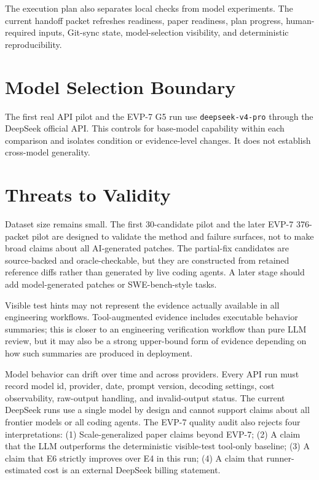\documentclass[conference]{IEEEtran}
\begin{document}
The execution plan also separates local checks from model experiments. The
current handoff packet refreshes readiness, paper readiness, plan progress,
human-required inputs, Git-sync state, model-selection visibility, and
deterministic reproducibility.

\section{Model Selection Boundary}

The first real API pilot and the EVP-7 G5 run use \texttt{deepseek-v4-pro}
through the DeepSeek official API. This controls for base-model capability
within each comparison and isolates condition or evidence-level changes. It
does not establish cross-model generality.

\section{Threats to Validity}

Dataset size remains small. The first 30-candidate pilot and the later EVP-7
376-packet pilot are designed to validate the
method and failure surfaces, not to make broad claims about all AI-generated
patches. The partial-fix candidates are source-backed and oracle-checkable, but
they are constructed from retained reference diffs rather than generated by
live coding agents. A later stage should add model-generated patches or
SWE-bench-style tasks.

Visible test hints may not represent the evidence actually available in all
engineering workflows. Tool-augmented evidence includes executable behavior
summaries; this is closer to an engineering verification workflow than pure
LLM review, but it may also be a strong upper-bound form of evidence depending
on how such summaries are produced in deployment.

Model behavior can drift over time and across providers. Every API run must
record model id, provider, date, prompt version, decoding settings, cost
observability, raw-output handling, and invalid-output status. The current
DeepSeek runs use a single model by design and cannot support claims about all
frontier models or all coding agents. The EVP-7 quality audit also rejects four
interpretations: (1) Scale-generalized paper claims beyond EVP-7; (2) A claim that the LLM outperforms the deterministic visible-test tool-only baseline; (3) A claim that E6 strictly improves over E4 in this run; (4) A claim that runner-estimated cost is an external DeepSeek billing statement.
\end{document}
